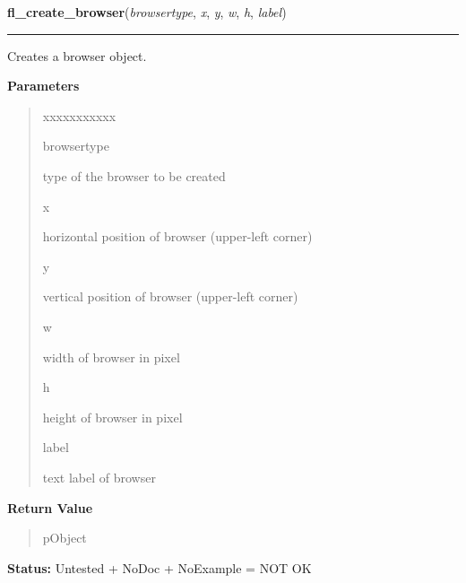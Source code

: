     \label{xformslib:library:fl_create_browser}

    \vspace{0.5ex}

\hspace{.8\funcindent}\begin{boxedminipage}{\funcwidth}

    \raggedright \textbf{fl\_create\_browser}(\textit{browsertype}, \textit{x}, \textit{y}, \textit{w}, \textit{h}, \textit{label})

    \vspace{-1.5ex}

    \rule{\textwidth}{0.5\fboxrule}
\setlength{\parskip}{2ex}
    Creates a browser object.

\setlength{\parskip}{1ex}
      \textbf{Parameters}
      \vspace{-1ex}

      \begin{quote}
        \begin{Ventry}{xxxxxxxxxxx}

          \item[browsertype]

          type of the browser to be created

          \item[x]

          horizontal position of browser (upper-left corner)

          \item[y]

          vertical position of browser (upper-left corner)

          \item[w]

          width of browser in pixel

          \item[h]

          height of browser in pixel

          \item[label]

          text label of browser

        \end{Ventry}

      \end{quote}

      \textbf{Return Value}
    \vspace{-1ex}

      \begin{quote}
      pObject

      \end{quote}

\textbf{Status:} Untested + NoDoc + NoExample = NOT OK



    \end{boxedminipage}

